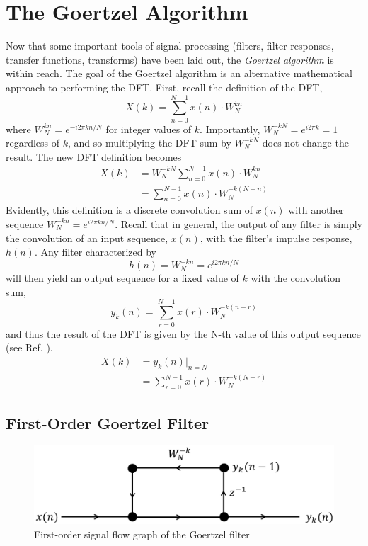 \documentclass[reprint,amsmath,amssymb,aps,pra]{revtex4-2}
\begin{document}
\section{The Goertzel Algorithm}

Now that some important tools of signal processing (filters, filter responses, transfer functions, transforms) have been laid out, the \textit{Goertzel algorithm} is within reach. The goal of the Goertzel algorithm is an alternative mathematical approach to performing the DFT. First, recall the definition of the DFT,
$$
    X(k) = \sum_{n=0}^{N-1}{x(n)\cdot W_N^{kn}}
$$
where $W_N^{kn} = e^{-i2\pi kn/N}$ for integer values of $k$. Importantly, $W_N^{-kN} = e^{i2\pi k} = 1$ regardless of $k$, and so multiplying the DFT sum by $W_N^{-kN}$ does not change the result. The new DFT definition becomes
\begin{align}
    X(k) & = W_N^{-kN} \sum_{n=0}^{N-1}{x(n)\cdot W_N^{kn}}\nonumber \\
         & = \sum_{n=0}^{N-1}{x(n)\cdot W_N^{-k(N-n)}}
\end{align}
Evidently, this definition is a discrete convolution sum of $x(n)$ with another sequence $W_N^{-kn} = e^{i2\pi kn/N}$. Recall that in general, the output of any filter is simply the convolution of an input sequence, $x(n)$, with the filter's impulse response, $h(n)$. Any filter characterized by 
\begin{equation}
    h(n) = W_N^{-kn} = e^{i2\pi kn/N}
\end{equation}
 will then yield an output sequence for a fixed value of $k$ with the convolution sum,
 \begin{equation}
     y_k(n) = \sum_{r=0}^{N-1}{x(r)\cdot W_N^{-k(n-r)}}
 \end{equation}
 and thus the result of the DFT is given by the N-th value of this output sequence (see Ref. \cite{DSP}).
 \begin{align}
     X(k) & = y_k(n)|_{n=N} 
    \nonumber \\
     & = \sum_{r=0}^{N-1}{x(r)\cdot W_N^{-k(N-r)}}
 \end{align}

\subsection{First-Order Goertzel Filter}

\begin{figure}
    \centering
    \includegraphics[width=\linewidth]{figs/goertzel_network1.png}
    \caption{First-order signal flow graph of the Goertzel filter}
    \label{fig:flograph1}
\end{figure}
\end{document}
